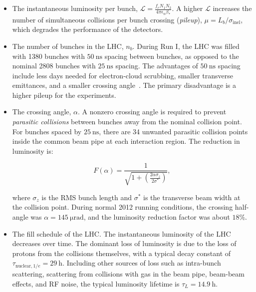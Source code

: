 \begin{itemize}
	\item The instantaneous luminosity per bunch, $\mathcal{L}=\frac{f_r N_1 N_2}{4\pi\epsilon_n \beta_{*}}$. A higher $\mathcal{L}$ increases the number of simultaneous collisions per bunch crossing (\emph{pileup}), $\mu=L_b/\sigma_{\mathrm{inel}}$, which degrades the performance of the detectors. 

	\item The number of bunches in the LHC, $n_b$. During Run I, the LHC was filled with 1380 bunches with $\SI{50}{\nano\second}$ spacing between bunches, as opposed to the nominal 2808 bunches with $\SI{25}{\nano\second}$ spacing. The advantages of $\SI{50}{\nano\second}$ spacing include less days needed for electron-cloud scrubbing, smaller transverse emittances, and a smaller crossing angle~\cite{Papotti:2014vb}. The primary disadvantage is a higher pileup for the experiments. 

	\item The crossing angle, $\alpha$. A nonzero crossing angle is required to prevent \emph{parasitic collisions} between bunches away from the nominal collision point. For bunches spaced by $\SI{25}{\nano\second}$, there are 34 unwanted parasitic collision points inside the common beam pipe at each interaction region. The reduction in luminosity is:

	\begin{equation}
		F(\alpha)=\frac{1}{\sqrt{1+\left(\frac{2\alpha \sigma_z}{2\sigma^*}\right)}},
	\end{equation}
	
	where $\sigma_z$ is the RMS bunch length and $\sigma^{*}$ is the transverse beam width at the collision point. During normal 2012 running conditions, the crossing half-angle was $\alpha=\SI{145}{\micro\radian}$, and the luminosity reduction factor was about $18\%$. 

	\item The fill schedule of the LHC. The instantaneous luminosity of the LHC decreases over time. The dominant loss of luminosity is due to the loss of protons from the collisions themselves, with a typical decay constant of $\tau_{\mathrm{nuclear},1/e}=\SI{29}{\hour}$. Including other sources of loss such as intra-bunch scattering, scattering from collisions with gas in the beam pipe, beam-beam effects, and RF noise, the typical luminosity lifetime is $\tau_L=\SI{14.9}{\hour}$. 


\end{itemize}
